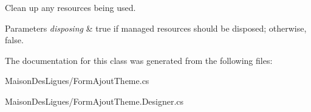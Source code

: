 Clean up any resources being used. 


\begin{DoxyParams}{Parameters}
{\em disposing} & true if managed resources should be disposed; otherwise, false.\\
\hline
\end{DoxyParams}


The documentation for this class was generated from the following files\+:\begin{DoxyCompactItemize}
\item 
Maison\+Des\+Ligues/Form\+Ajout\+Theme.\+cs\item 
Maison\+Des\+Ligues/Form\+Ajout\+Theme.\+Designer.\+cs\end{DoxyCompactItemize}
